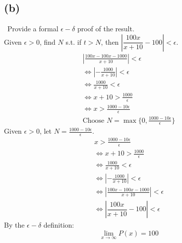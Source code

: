 \documentclass[12pt]{article}
\begin{document}
\subsection{(b)} \, Provide a formal $\epsilon - \delta$ proof of the result.\\
Given $\epsilon > 0$, find $N$ s.t. if $t>N$, then $|\dfrac{100x}{x+10}-100|<\epsilon$.
\begin{gather*}
    |\frac{100x-100x-1000}{x+10}|<\epsilon\\
    \iff |-\frac{1000}{x+10}|<\epsilon\\
    \iff \frac{1000}{x+10}<\epsilon\\
    \iff x+10>\frac{1000}{\epsilon}\\
    \iff x>\frac{1000-10\epsilon}{\epsilon}\\
    \boxed{\text{Choose } N = \max \{ 0, \frac{1000-10\epsilon}{\epsilon} \} }
\end{gather*}
Given $\epsilon>0$, let $N=\frac{1000-10\epsilon}{\epsilon}$.
\begin{gather*}
    x>\frac{1000-10\epsilon}{\epsilon}\\
    \iff x+10>\frac{1000}{\epsilon}\\
    \iff \frac{1000}{x+10}<\epsilon\\
    \iff |-\frac{1000}{x+10}|<\epsilon\\
    \iff |\frac{100x-100x-1000}{x+10}|<\epsilon\\
    \iff |\dfrac{100x}{x+10}-100|<\epsilon
\end{gather*}
By the $\epsilon - \delta$ definition:
\[
\boxed{\lim_{x \to \infty} P(x)=100}
\]
\end{document}
